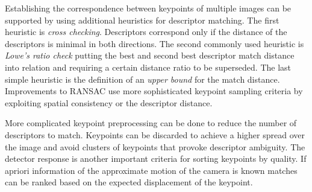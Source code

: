 Establishing the correspondence between keypoints of multiple images can be supported by using additional heuristics for descriptor matching.
The first heuristic is \emph{cross checking}.
Descriptors correspond only if the distance of the descriptors is minimal in both directions.
The second commonly used heuristic is \emph{Lowe's ratio check}\cite{lowe_ijcv04} putting the best and second best descriptor match distance into relation and requiring a certain distance ratio to be superseded.
The last simple heuristic is the definition of an \emph{upper bound} for the match distance.
Improvements to \acrshort{RANSAC}\cite{sattler_iccv2009,chum_cvpr2005} use more sophisticated keypoint sampling criteria by exploiting spatial consistency or the descriptor distance.

More complicated keypoint preprocessing can be done to reduce the number of descriptors to match.
Keypoints can be discarded to achieve a higher spread over the image and avoid clusters of keypoints that provoke descriptor ambiguity.
The detector response is another important criteria for sorting keypoints by quality.
If apriori information of the approximate motion of the camera is known matches can be ranked based on the expected displacement of the keypoint.
